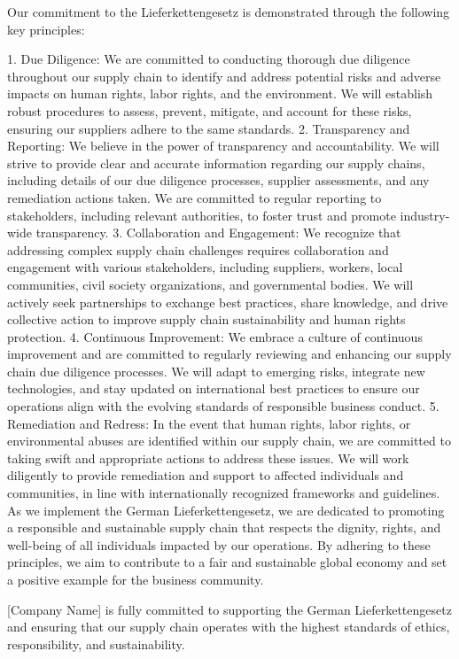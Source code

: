 \documentclass{article}
\begin{document}
Our commitment to the Lieferkettengesetz is demonstrated through the following key principles:

1. Due Diligence: We are committed to conducting thorough due diligence throughout our supply chain to identify and address potential risks and adverse impacts
on human rights, labor rights, and the environment. We will establish robust procedures to assess, prevent, mitigate, and account for these risks, ensuring
our suppliers adhere to the same standards.
2. Transparency and Reporting: We believe in the power of transparency and accountability. We will strive to provide clear and accurate information regarding
our supply chains, including details of our due diligence processes, supplier assessments, and any remediation actions taken. We are committed to regular reporting
to stakeholders, including relevant authorities, to foster trust and promote industry-wide transparency.
3. Collaboration and Engagement: We recognize that addressing complex supply chain challenges requires collaboration and engagement with various stakeholders,
including suppliers, workers, local communities, civil society organizations, and governmental bodies. We will actively seek partnerships to exchange best practices,
share knowledge, and drive collective action to improve supply chain sustainability and human rights protection.
4. Continuous Improvement: We embrace a culture of continuous improvement and are committed to regularly reviewing and enhancing our supply chain due diligence processes.
We will adapt to emerging risks, integrate new technologies, and stay updated on international best practices to ensure our operations align with the evolving
standards of responsible business conduct.
5. Remediation and Redress: In the event that human rights, labor rights, or environmental abuses are identified within our supply chain, we are committed to taking
swift and appropriate actions to address these issues. We will work diligently to provide remediation and support to affected individuals and communities, in line
with internationally recognized frameworks and guidelines.
As we implement the German Lieferkettengesetz, we are dedicated to promoting a responsible and sustainable supply chain that respects the dignity, rights, and
well-being of all individuals impacted by our operations. By adhering to these principles, we aim to contribute to a fair and sustainable global economy and set
a positive example for the business community.

[Company Name] is fully committed to supporting the German Lieferkettengesetz and ensuring that our supply chain operates with the highest standards of ethics,
responsibility, and sustainability.
\end{document}
